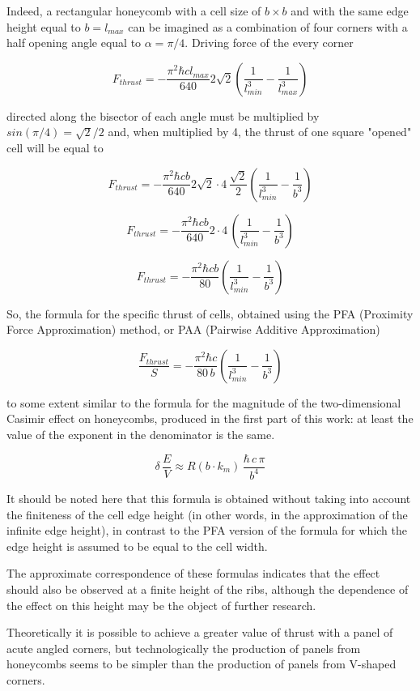 \documentclass[twoside, 10pt]{article}
\begin{document}
\begin{multicols}{2}
Indeed, a rectangular honeycomb with a cell size of \(b \times b\) and
with the same edge height equal to \(b = l_{max}\) can be imagined as a
combination of four corners with a half opening angle equal to
\(\alpha = {\pi}/{4}\). Driving force of the every corner

\[F_{thrust} = - \frac{\pi^2\hbar c l_{max}}{640} 2\sqrt{2} \left(\frac{1}{l_{min}^3} - \frac{1}{l_{max}^3}\right)\]

directed along the bisector of each angle must be multiplied by
\(sin\left({\pi}/{4}\right)={\sqrt{2}}\big/{2}\) and, when multiplied by
4, the thrust of one square "opened" cell will be equal to

\[F_{thrust} = - \frac{\pi^2\hbar c b}{640} 2\sqrt{2}\cdot4\,\frac{\sqrt{2}}{2} \left(\frac{1}{l_{min}^3} - \frac{1}{b^3}\right)\]

\[F_{thrust} = - \frac{\pi^2\hbar c b}{640} 2\cdot4\,\left(\frac{1}{l_{min}^3} - \frac{1}{b^3}\right)\]

\[F_{thrust} = - \frac{\pi^2\hbar c b}{80} \left(\frac{1}{l_{min}^3} - \frac{1}{b^3}\right)\]

So, the formula for the specific thrust of cells, obtained using the PFA
(Proximity Force Approximation) method, or PAA (Pairwise Additive
Approximation)

\[\frac{F_{thrust}}{S} = - \frac{\pi^2\hbar c}{80\, b} \left(\frac{1}{l_{min}^3} - \frac{1}{b^3}\right)\]

to some extent similar to the formula for the magnitude of the
two-dimensional Casimir effect on honeycombs, produced in the first part
of this work: at least the value of the exponent in the denominator is
the same.

\[\delta\,\frac{E}{V} \approx R\left(b \cdot k_m\right)\,\frac{\hbar\,c\,\pi}{b^4}\]

It should be noted here that this formula is obtained without taking
into account the finiteness of the cell edge height (in other words, in
the approximation of the infinite edge height), in contrast to the PFA
version of the formula for which the edge height is assumed to be equal
to the cell width.

The approximate correspondence of these formulas indicates that the
effect should also be observed at a finite height of the ribs, although
the dependence of the effect on this height may be the object of further
research.

Theoretically it is possible to achieve a greater value of thrust with a
panel of acute angled corners, but technologically the production of
panels from honeycombs seems to be simpler than the production of panels
from V-shaped corners.



\end{multicols}
\end{document}
